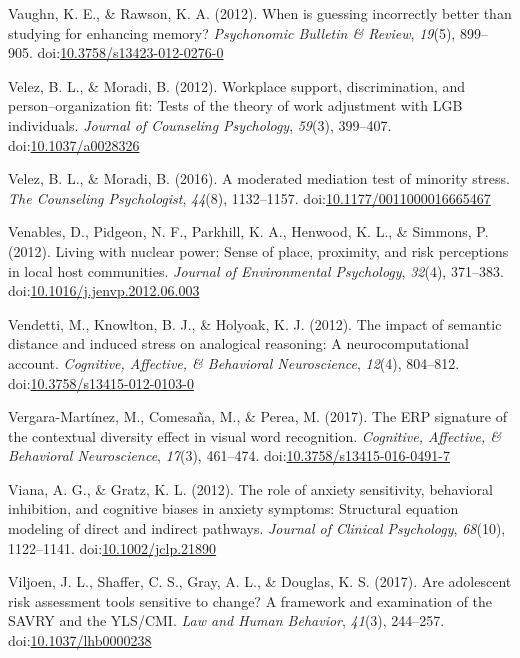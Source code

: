 \documentclass[english,man]{apa6}
\begin{document}
\hypertarget{ref-Vaughn2012}{}
Vaughn, K. E., \& Rawson, K. A. (2012). When is guessing incorrectly
better than studying for enhancing memory? \emph{Psychonomic Bulletin \&
Review}, \emph{19}(5), 899--905.
doi:\href{https://doi.org/10.3758/s13423-012-0276-0}{10.3758/s13423-012-0276-0}

\hypertarget{ref-Velez2012}{}
Velez, B. L., \& Moradi, B. (2012). Workplace support, discrimination,
and person--organization fit: Tests of the theory of work adjustment
with LGB individuals. \emph{Journal of Counseling Psychology},
\emph{59}(3), 399--407.
doi:\href{https://doi.org/10.1037/a0028326}{10.1037/a0028326}

\hypertarget{ref-Velez2016}{}
Velez, B. L., \& Moradi, B. (2016). A moderated mediation test of
minority stress. \emph{The Counseling Psychologist}, \emph{44}(8),
1132--1157.
doi:\href{https://doi.org/10.1177/0011000016665467}{10.1177/0011000016665467}

\hypertarget{ref-Venables2012}{}
Venables, D., Pidgeon, N. F., Parkhill, K. A., Henwood, K. L., \&
Simmons, P. (2012). Living with nuclear power: Sense of place,
proximity, and risk perceptions in local host communities. \emph{Journal
of Environmental Psychology}, \emph{32}(4), 371--383.
doi:\href{https://doi.org/10.1016/j.jenvp.2012.06.003}{10.1016/j.jenvp.2012.06.003}

\hypertarget{ref-Vendetti2012}{}
Vendetti, M., Knowlton, B. J., \& Holyoak, K. J. (2012). The impact of
semantic distance and induced stress on analogical reasoning: A
neurocomputational account. \emph{Cognitive, Affective, \& Behavioral
Neuroscience}, \emph{12}(4), 804--812.
doi:\href{https://doi.org/10.3758/s13415-012-0103-0}{10.3758/s13415-012-0103-0}

\hypertarget{ref-Vergara-Martinez2017}{}
Vergara-Martínez, M., Comesaña, M., \& Perea, M. (2017). The ERP
signature of the contextual diversity effect in visual word recognition.
\emph{Cognitive, Affective, \& Behavioral Neuroscience}, \emph{17}(3),
461--474.
doi:\href{https://doi.org/10.3758/s13415-016-0491-7}{10.3758/s13415-016-0491-7}

\hypertarget{ref-Viana2012}{}
Viana, A. G., \& Gratz, K. L. (2012). The role of anxiety sensitivity,
behavioral inhibition, and cognitive biases in anxiety symptoms:
Structural equation modeling of direct and indirect pathways.
\emph{Journal of Clinical Psychology}, \emph{68}(10), 1122--1141.
doi:\href{https://doi.org/10.1002/jclp.21890}{10.1002/jclp.21890}

\hypertarget{ref-Viljoen2017}{}
Viljoen, J. L., Shaffer, C. S., Gray, A. L., \& Douglas, K. S. (2017).
Are adolescent risk assessment tools sensitive to change? A framework
and examination of the SAVRY and the YLS/CMI. \emph{Law and Human
Behavior}, \emph{41}(3), 244--257.
doi:\href{https://doi.org/10.1037/lhb0000238}{10.1037/lhb0000238}
\end{document}
